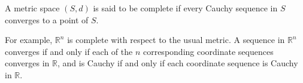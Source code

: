 A metric space $(S, d)$ is said to be complete if every Cauchy sequence in $S$ converges to a point of $S$.

For example, $\mathbb{R}^n$ is complete with respect to the usual metric. A sequence in $\mathbb{R}^n$ converges if and only if each of the $n$ corresponding coordinate sequences converges in $\mathbb{R}$, and is Cauchy if and only if each coordinate sequence is Cauchy in $\mathbb{R}$.
